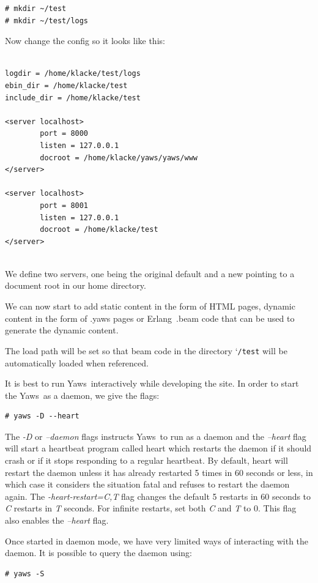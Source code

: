 \documentclass[11pt,oneside,english]{book}
\newcommand{\Erlang}            %
        {{\sc Erlang}}
\newcommand{\Yaws}            %
        {{\sc Yaws}}
\begin{document}
\begin{verbatim}
# mkdir ~/test
# mkdir ~/test/logs
\end{verbatim}

Now change the config so it looks like this:

\begin{verbatim}

logdir = /home/klacke/test/logs
ebin_dir = /home/klacke/test
include_dir = /home/klacke/test

<server localhost>
        port = 8000
        listen = 127.0.0.1
        docroot = /home/klacke/yaws/yaws/www
</server>

<server localhost>
        port = 8001
        listen = 127.0.0.1
        docroot = /home/klacke/test
</server>


\end{verbatim}

We define two servers, one being the original default
and a new pointing to a document root in our home directory.

We can now start to add static content in the form of
HTML pages, dynamic content in the form of .yaws pages or
\Erlang\ .beam code that can be used to generate the dynamic content.

The load path will be set so that beam code in the directory
\char`\~\verb+/test+ will be automatically loaded when referenced.

It is best to run \Yaws\  interactively while developing the site.
In order to start the \Yaws\  as a daemon, we give the flags:
\begin{verbatim}
# yaws -D --heart
\end{verbatim}

The \textit{-D} or \textit{--daemon} flags instructs \Yaws\ to run as
a daemon and the \textit{--heart} flag will start a heartbeat program
called heart which restarts the daemon if it should crash or if it
stops responding to a regular heartbeat. By default, heart will
restart the daemon unless it has already restarted 5 times in 60
seconds or less, in which case it considers the situation fatal and
refuses to restart the daemon again. The \textit{-heart-restart=C,T}
flag changes the default 5 restarts in 60 seconds to \textit{C}
restarts in \textit{T} seconds. For infinite restarts, set both
\textit{C} and \textit{T} to 0. This flag also enables the
\textit{--heart} flag.

Once started in daemon mode, we have very limited ways of interacting
with the daemon. It is possible to query the daemon using:
\begin{verbatim}
# yaws -S
\end{verbatim}
\end{document}
